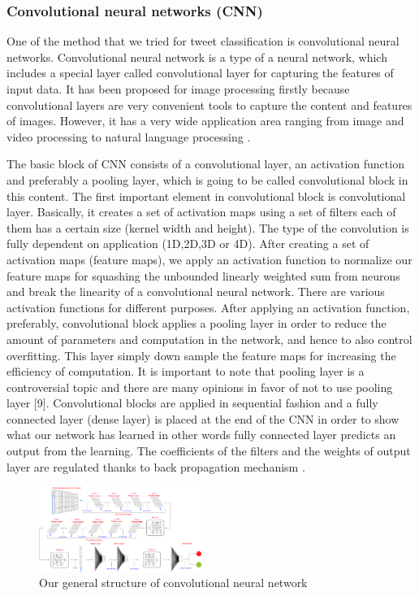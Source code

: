 \documentclass[10pt,conference,compsocconf]{IEEEtran}
\begin{document}
\subsubsection{Convolutional neural networks (CNN)}


One of the method that we tried for tweet classification is convolutional neural networks. Convolutional neural network is a type of a neural network, which includes a special layer called convolutional layer for capturing the features of input data. It has been proposed for image processing firstly because convolutional layers are very convenient tools to capture the content and features of images. However, it has a very wide application area ranging from image and video processing to natural language processing \cite{cnn1}.


The basic block of CNN consists of a convolutional layer, an activation function and preferably a pooling layer, which is going to be called convolutional block in this content. The first important element in convolutional block is convolutional layer. Basically, it creates a set of activation maps using a set of filters each of them has a certain size (kernel width and height). The type of the convolution is fully dependent on application (1D,2D,3D or 4D). After creating a set of activation maps (feature maps), we apply an activation function to normalize our feature maps for squashing the unbounded linearly weighted sum from neurons and break the linearity of a convolutional neural network. There are various activation functions for different purposes. After applying an activation function, preferably, convolutional block applies a pooling layer in order to reduce the amount of parameters and computation in the network, and hence to also control overfitting. This layer simply down sample the feature maps for increasing the efficiency of computation. It is important to note that pooling layer is a controversial topic and there are many opinions in favor of not to use pooling layer [9]. Convolutional blocks are applied in sequential fashion and a fully connected layer (dense layer) is placed at the end of the CNN in order to show what our network has learned in other words fully connected layer predicts an output from the learning. The coefficients of the filters and the weights of output layer are regulated thanks to back propagation mechanism \cite{cnn1}  \cite{cnn3} \cite{cnn4}.
\begin{figure}[!htb]
	\centering \includegraphics[width=200px]{../plots/cnn}
	\caption{Our general structure of convolutional neural network}
	\label{fig:data}
\end{figure}
\end{document}
